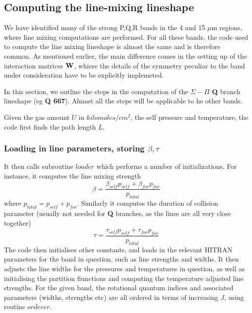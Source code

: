 \documentclass[11pt]{article}
\begin{document}
\subsection{Computing the line-mixing lineshape}

We have identified many of the strong P,Q,R bands in the 4 and 15 $\mu$m 
regions, where line mixing computations are performed. For all these bands, 
the code used to compute the line mixing lineshape is almost the same and
is therefore common. As mentioned earlier, the main difference comes in the
setting up of the interaction matrices ${\bf W}$, whiere the details of the
symmetry peculiar to the band under consideration have to be explicitly
implemeted.

In this section, we outline the steps in the computation of the $\Sigma-\Pi$
{\bf Q} branch lineshape (eg {\bf Q 667}). Almost all the steps will be 
applicable to he other bands.

Given the gas amount $U$ in $kilomoles/cm^{2}$, the self pressure and 
temperature, the code first finds the path length $L$. 

\subsubsection{Loading in line parameters, storing $\beta, \tau$}
It then calls subroutine $loader$ which performs a number of 
initializations. For instance, it computes the line mixing strength
\[
\beta = \frac{\beta_{self}p_{self} + \beta_{for}p_{for}}{p_{total}}
\]
where $p_{total} = p_{self} + p_{for}$. Similarly it computes the duration 
of collision parameter (usually not needed for {\bf Q} branches, as the 
lines are all very close together)
\[
\tau = \frac{\tau_{self}p_{self} + \tau_{for}p_{for}}{p_{total}}
\]
The code then initialises other constants, and loads in the relevant
HITRAN parameters for the band in question, such as line strengths and 
widths. It then adjusts the line widths for the pressures and temperatures
in question, as well as initialising the partition fiunctions and computing
the temperature adjusted line strengths. For the given band, the rotational
quantum indices and associated parameters (widths, strengths etc) are all
ordered in terms of increasing $J$, using routine $orderer$.
\end{document}
